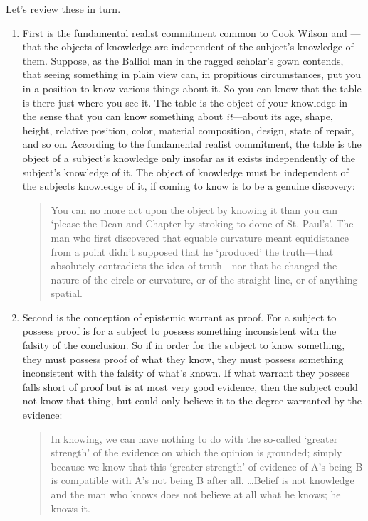 \documentclass[12pt]{article}
\begin{document}
Let's review these in turn.

\begin{enumerate}[(1)]
	\item First is the fundamental realist commitment common to Cook Wilson and \citet{Moore:1903uo}\----that the objects of knowledge are independent of the subject's knowledge of them. Suppose, as the Balliol man in the ragged scholar's gown contends, that seeing something in plain view can, in propitious circumstances, put you in a position to know various things about it. So you can know that the table is there just where you see it. The table is the object of your knowledge in the sense that you can know something about \emph{it}---about its age, shape, height, relative position, color, material composition, design, state of repair, and so on. According to the fundamental realist commitment, the table is the object of a subject's knowledge only insofar as it exists independently of the subject's knowledge of it. The object of knowledge must be independent of the subjects knowledge of it, if coming to know is to be a genuine discovery:
		\begin{quote}
			You can no more act upon the object by knowing it than you can `please the Dean and Chapter by stroking to dome of St. Paul's'. The man who first discovered that equable curvature meant equidistance from a point didn't supposed that he `produced' the truth---that absolutely contradicts the idea of truth---nor that he changed the nature of the circle or curvature, or of the straight line, or of anything spatial. \citep[\emph{Correspondence with Prichard 1904},][802]{Cook-Wilson:1926sf}
		\end{quote}
	\item Second is the conception of epistemic warrant as proof. For a subject to possess proof is for a subject to possess something inconsistent with the falsity of the conclusion. So if in order for the subject to know something, they must possess proof of what they know, they must possess something inconsistent with the falsity of what's known. If what warrant they possess falls short of proof but is at most very good evidence, then the subject could not know that thing, but could only believe it to the degree warranted by the evidence: 
		\begin{quote}
			In knowing, we can have nothing to do with the so-called `greater strength' of the evidence on which the opinion is grounded; simply because we know that this `greater strength' of evidence of A's being B is compatible with A's not being B after all. \ldots Belief is not knowledge and the man who knows does not believe at all what he knows; he knows it. \citep[\emph{Statement and Inference} \textsc{ii}.3, \emph{Opinion, Conviction, Belief and Cognate States},][100]{Cook-Wilson:1926sf}

\end{quote}
\end{enumerate}
\end{document}
